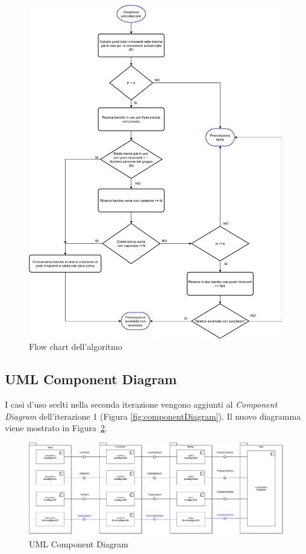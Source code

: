 \begin{figure}[htbp]
    \includegraphics[scale=0.45]{images/iterazione2/flowChart.png}
    \centering
    \caption{Flow chart dell'algoritmo}\label{fig:flowChart}
\end{figure}

\clearpage
\subsection{UML Component Diagram}
I casi d’uso scelti nella seconda iterazione vengono aggiunti al \textit{Component Diagram} dell'iterazione 1 (Figura \ref{fig:componentDiagram}). Il nuovo diagramma viene mostrato in  Figura~\ref{fig:componentDiagram2}.

\begin{figure}[htbp]
    \includegraphics[width=\textwidth]{images/iterazione2/diagrams/ComponentDiagram_v1.png}
    \centering
    \caption{UML Component Diagram}\label{fig:componentDiagram2}
\end{figure}

